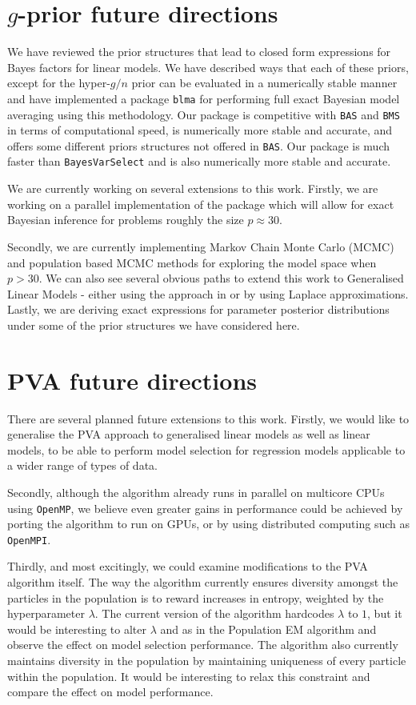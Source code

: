 \section{$g$-prior future directions}

We have reviewed the prior structures that lead to closed form expressions for
Bayes factors for linear models. We have described ways that each of these
priors, except for the hyper-$g/n$ prior can be evaluated in a numerically stable
manner and have implemented a package \texttt{blma} for performing full exact
Bayesian model averaging using this methodology. Our package is competitive
with \texttt{BAS} and \texttt{BMS} in terms of computational speed, is
numerically more stable and accurate, and offers some different priors
structures not offered in \texttt{BAS}. Our package is much faster than
\texttt{BayesVarSelect} and is also numerically more stable and accurate.

We are currently working on several extensions to this work. Firstly, we are
working on a parallel implementation of the package which will allow for exact
Bayesian inference for problems roughly the size $p\approx 30$.

Secondly, we are currently implementing  Markov Chain Monte Carlo (MCMC) and
population based MCMC methods for exploring the model space when $p>30$.  We
can also see several obvious paths to extend this work to Generalised Linear
Models - either using the approach in \cite{Li2015} or by using Laplace
approximations.  Lastly, we are deriving exact expressions for parameter
posterior distributions under some of the prior structures we have considered
here.

\section{PVA future directions}

There are several planned future extensions to this work. Firstly, we would
like to generalise the PVA approach to generalised linear models as well as
linear models, to be able to perform model selection for regression models
applicable to a wider range of types of data.

Secondly, although the algorithm already runs in parallel on multicore CPUs
using \texttt{OpenMP}, we believe even greater gains in performance could be
achieved by porting the algorithm to run on GPUs, or by using distributed
computing such as \texttt{OpenMPI}.

Thirdly, and most excitingly, we could examine modifications to the PVA
algorithm itself. The way the algorithm currently ensures diversity amongst the
particles in the population is to reward increases in entropy, weighted by the
hyperparameter $\lambda$. The current version of the algorithm hardcodes
$\lambda$ to $1$, but it would be interesting to alter $\lambda$ and as in the
Population EM algorithm \cite{Tan2018} and observe the effect on model
selection performance. The algorithm also currently maintains diversity in the
population by maintaining uniqueness of every particle within the population.
It would be interesting to relax this constraint and compare the effect on
model performance.
